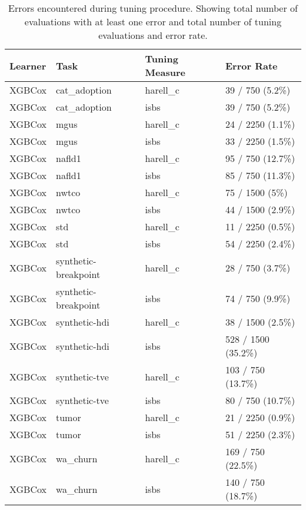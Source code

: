 \begin{table}
\centering
\caption{Errors encountered during tuning procedure. Showing total number of evaluations with at least one error and total number of tuning evaluations and error rate.\label{tab:bm-errors}}
\centering
\begin{tabular}[t]{llll}
\toprule
Learner & Task & Tuning Measure & Error Rate\\
\midrule
XGBCox & cat\_adoption & harell\_c & 39 / 750 (5.2\%)\\
XGBCox & cat\_adoption & isbs & 39 / 750 (5.2\%)\\
XGBCox & mgus & harell\_c & 24 / 2250 (1.1\%)\\
XGBCox & mgus & isbs & 33 / 2250 (1.5\%)\\
XGBCox & nafld1 & harell\_c & 95 / 750 (12.7\%)\\
XGBCox & nafld1 & isbs & 85 / 750 (11.3\%)\\
XGBCox & nwtco & harell\_c & 75 / 1500 (5\%)\\
XGBCox & nwtco & isbs & 44 / 1500 (2.9\%)\\
XGBCox & std & harell\_c & 11 / 2250 (0.5\%)\\
XGBCox & std & isbs & 54 / 2250 (2.4\%)\\
XGBCox & synthetic-breakpoint & harell\_c & 28 / 750 (3.7\%)\\
XGBCox & synthetic-breakpoint & isbs & 74 / 750 (9.9\%)\\
XGBCox & synthetic-hdi & harell\_c & 38 / 1500 (2.5\%)\\
XGBCox & synthetic-hdi & isbs & 528 / 1500 (35.2\%)\\
XGBCox & synthetic-tve & harell\_c & 103 / 750 (13.7\%)\\
XGBCox & synthetic-tve & isbs & 80 / 750 (10.7\%)\\
XGBCox & tumor & harell\_c & 21 / 2250 (0.9\%)\\
XGBCox & tumor & isbs & 51 / 2250 (2.3\%)\\
XGBCox & wa\_churn & harell\_c & 169 / 750 (22.5\%)\\
XGBCox & wa\_churn & isbs & 140 / 750 (18.7\%)\\
\bottomrule
\end{tabular}
\end{table}
